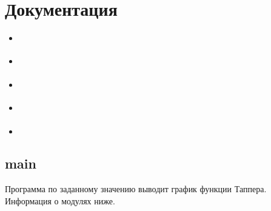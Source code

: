 \documentclass[a4paper,10pt,russian]{sphinxmanual}
\begin{document}
\chapter{Документация}
\label{\detokenize{index:id4}}
\begin{sphinxShadowBox}
\begin{itemize}
\item {} 
\sphinxAtStartPar
{}\label{\detokenize{index:id6}}{\hyperref[\detokenize{index:module-main}]{}}

\item {} 
\sphinxAtStartPar
{}\label{\detokenize{index:id7}}{\hyperref[\detokenize{index:module-config}]{}}

\item {} 
\sphinxAtStartPar
{}\label{\detokenize{index:id8}}{\hyperref[\detokenize{index:module-formula}]{}}

\item {} 
\sphinxAtStartPar
{}\label{\detokenize{index:id9}}{\hyperref[\detokenize{index:module-display}]{}}

\item {} 
\sphinxAtStartPar
{}\label{\detokenize{index:id10}}{\hyperref[\detokenize{index:indices-and-tables}]{}}

\end{itemize}
\end{sphinxShadowBox}


\section{main}
\label{\detokenize{index:module-main}}\label{\detokenize{index:main}}

\begin{fulllineitems}
\label{\detokenize{index:main.main}}
\pysigstartsignatures
{}
\pysigstopsignatures
\sphinxAtStartPar
{}

\sphinxAtStartPar
Программа по заданному значению выводит график функции Таппера.
Информация о модулях ниже.

\end{fulllineitems}
\end{document}
